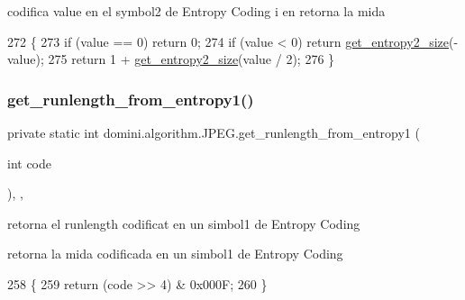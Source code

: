 codifica value en el symbol2 de Entropy Coding i en retorna la mida 


\begin{DoxyCode}
272                                                     \{
273         \textcolor{keywordflow}{if} (value == 0) \textcolor{keywordflow}{return} 0;
274         \textcolor{keywordflow}{if} (value < 0) \textcolor{keywordflow}{return} \hyperlink{classdomini_1_1algorithm_1_1JPEG_aa9bc9bee7181efee254be843e23ee2c6}{get\_entropy2\_size}(-value);
275         \textcolor{keywordflow}{return} 1 + \hyperlink{classdomini_1_1algorithm_1_1JPEG_aa9bc9bee7181efee254be843e23ee2c6}{get\_entropy2\_size}(value / 2);
276     \}
\end{DoxyCode}
\mbox{\label{classdomini_1_1algorithm_1_1JPEG_ac58cb434a7acfd90fc8e548fd7c00ae2}} 
\subsubsection{\texorpdfstring{get\+\_\+runlength\+\_\+from\+\_\+entropy1()}{get\_runlength\_from\_entropy1()}}
{\footnotesize\ttfamily private static int domini.\+algorithm.\+J\+P\+E\+G.\+get\+\_\+runlength\+\_\+from\+\_\+entropy1 (\begin{DoxyParamCaption}\item[{int}]{code }\end{DoxyParamCaption})\hspace{0.3cm}{\ttfamily [inline]}, {\ttfamily [static]}, {\ttfamily [private]}}



retorna el runlength codificat en un simbol1 de Entropy Coding 

retorna la mida codificada en un simbol1 de Entropy Coding 
\begin{DoxyCode}
258                                                              \{
259         \textcolor{keywordflow}{return} (code >> 4) & 0x000F;
260     \}
\end{DoxyCode}
\mbox{\label{classdomini_1_1algorithm_1_1JPEG_a8d1005fb7833d36a064afb1c5e15bbd3}} 
